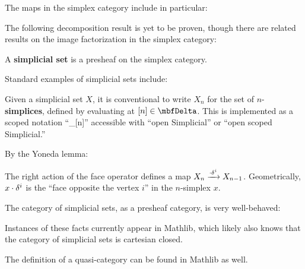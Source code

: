 
The maps in the simplex category include in particular:



The following decomposition result is yet to be proven, though there are related results on the image factorization in the simplex category:



\begin{defn}\label{defn:simplicial-set}
  \leanok
  A \textbf{simplicial set} is a presheaf on the simplex category.
\end{defn}


Standard examples of simplicial sets include:




Given a simplicial set $X$, it is conventional to write $X_n$ for the set of $n$-\textbf{sim\-plices}, defined by evaluating at $[n] \in \Del$. This is implemented as a scoped notation ``\_[n]'' accessible with ``open Simplicial'' or ``open scoped Simplicial.''

By the Yoneda lemma:



The right action of the face operator defines a map $X_n \xrightarrow{\cdot\delta^i} X_{n-1}$. Geometrically, $x\cdot \delta^i$ is the ``face opposite the vertex $i$'' in the $n$-simplex $x$.

The category of simplicial sets, as a presheaf category, is very well-behaved:






Instances of these facts currently appear in Mathlib, which likely also knows that the category of simplicial sets is cartesian closed.

The definition of a quasi-category can be found in Mathlib as well.


